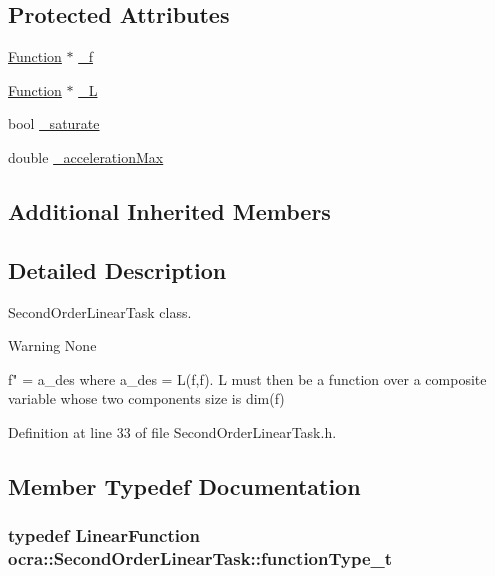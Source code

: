 \subsection*{Protected Attributes}
\begin{DoxyCompactItemize}
\item 
\hyperlink{classocra_1_1Function}{Function} $\ast$ \hyperlink{classocra_1_1SecondOrderLinearTask_a55c45007880f6ba1936bc9b4601dc58e}{\+\_\+f}
\item 
\hyperlink{classocra_1_1Function}{Function} $\ast$ \hyperlink{classocra_1_1SecondOrderLinearTask_a386a6daf02add8b19a69e1aa411c63af}{\+\_\+L}
\item 
bool \hyperlink{classocra_1_1SecondOrderLinearTask_a0d433a32e0892bdf98d3b15325b6917e}{\+\_\+saturate}
\item 
double \hyperlink{classocra_1_1SecondOrderLinearTask_aec8499eb3b78b46a1170d43f427a53a9}{\+\_\+acceleration\+Max}
\end{DoxyCompactItemize}
\subsection*{Additional Inherited Members}


\subsection{Detailed Description}
Second\+Order\+Linear\+Task class. 

\begin{DoxyWarning}{Warning}
None
\end{DoxyWarning}
f" = a\+\_\+des where a\+\_\+des = L(f,f\textquotesingle{}). L must then be a function over a composite variable whose two components\textquotesingle{} size is dim(f) 

Definition at line 33 of file Second\+Order\+Linear\+Task.\+h.



\subsection{Member Typedef Documentation}
\subsubsection[{\texorpdfstring{function\+Type\+\_\+t}{functionType_t}}]{\setlength{\rightskip}{0pt plus 5cm}typedef {\bf Linear\+Function} {\bf ocra\+::\+Second\+Order\+Linear\+Task\+::function\+Type\+\_\+t}}\hypertarget{classocra_1_1SecondOrderLinearTask_aa4843b0b2ad21ecba7decb2be86c6214}{}\label{classocra_1_1SecondOrderLinearTask_aa4843b0b2ad21ecba7decb2be86c6214}


